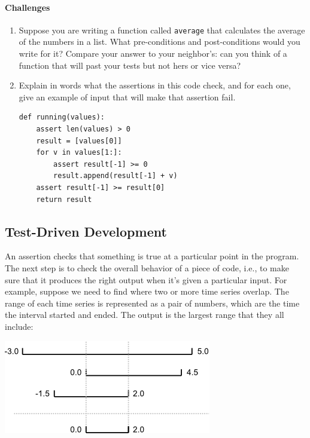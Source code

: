 \documentclass[]{book}
\begin{document}
\mbox{}\paragraph{Challenges}

\begin{enumerate}
\item
  Suppose you are writing a function called \texttt{average} that
  calculates the average of the numbers in a list. What pre-conditions
  and post-conditions would you write for it? Compare your answer to
  your neighbor's: can you think of a function that will past your tests
  but not hers or vice versa?
\item
  Explain in words what the assertions in this code check, and for each
  one, give an example of input that will make that assertion fail.

\begin{verbatim}
def running(values):
    assert len(values) > 0
    result = [values[0]]
    for v in values[1:]:
        assert result[-1] >= 0
        result.append(result[-1] + v)
    assert result[-1] >= result[0]
    return result
\end{verbatim}
\end{enumerate}

\subsection{Test-Driven Development}

An assertion checks that something is true at a particular point in the
program. The next step is to check the overall behavior of a piece of
code, i.e., to make sure that it produces the right output when it's
given a particular input. For example, suppose we need to find where two
or more time series overlap. The range of each time series is
represented as a pair of numbers, which are the time the interval
started and ended. The output is the largest range that they all
include:

\includegraphics{novice/python/img/python-overlapping-ranges.png}
\end{document}
